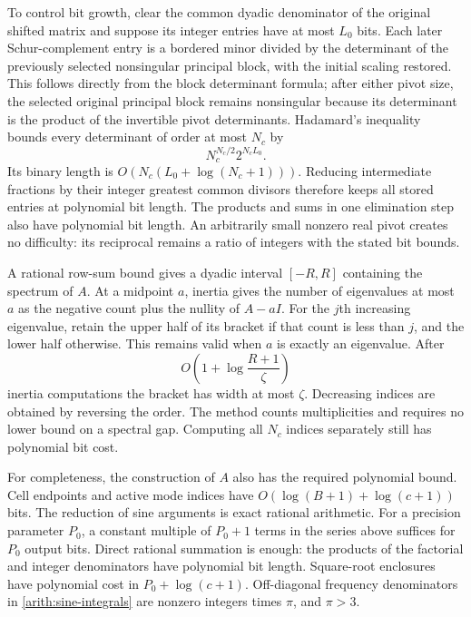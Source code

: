 \documentclass[11pt,reqno]{amsart}
\numberwithin{equation}{section}
\begin{document}
To control bit growth, clear the common dyadic denominator of
the original shifted matrix and suppose its integer entries
have at most $L_0$ bits.  Each later Schur-complement entry is
a bordered minor divided by the determinant of the previously
selected nonsingular principal block, with the initial scaling
restored.  This follows directly from the block determinant
formula; after either pivot size, the selected original
principal block remains nonsingular because its determinant
is the product of the invertible pivot determinants.
Hadamard's inequality bounds every determinant of order at
most $N_c$ by
\[
 N_c^{N_c/2}2^{N_cL_0}.
\]
Its binary length is
$O(N_c(L_0+\log(N_c+1)))$.  Reducing intermediate fractions by
their integer greatest common divisors therefore keeps all
stored entries at polynomial bit length.  The products and
sums in one elimination step also have polynomial bit length.
An arbitrarily small nonzero real pivot creates no difficulty:
its reciprocal remains a ratio of integers with the stated
bit bounds.

A rational row-sum bound gives a dyadic interval $[-R,R]$
containing the spectrum of $A$.  At a midpoint $a$, inertia
gives the number of eigenvalues at most $a$ as the negative
count plus the nullity of $A-aI$.  For the $j$th increasing
eigenvalue, retain the upper half of its bracket if that count
is less than $j$, and the lower half otherwise.  This remains
valid when $a$ is exactly an eigenvalue.  After
\[
 O\left(1+\log\frac{R+1}{\zeta}\right)
\]
inertia computations the bracket has width at most $\zeta$.
Decreasing indices are obtained by reversing the order.
The method counts multiplicities and requires no lower bound
on a spectral gap.  Computing all $N_c$ indices separately
still has polynomial bit cost.

For completeness, the construction of $A$ also has the
required polynomial bound.  Cell endpoints and active mode
indices have $O(\log(B+1)+\log(c+1))$ bits.
The reduction of sine arguments is exact rational arithmetic.
For a precision parameter $P_0$, a constant multiple of
$P_0+1$ terms in the series above suffices for $P_0$ output
bits.  Direct rational summation is enough: the products of
the factorial and integer denominators have polynomial bit
length.  Square-root enclosures have polynomial cost in
$P_0+\log(c+1)$.  Off-diagonal frequency denominators in
\eqref{arith:sine-integrals} are nonzero integers times $\pi$,
and $\pi>3$.
\end{document}
